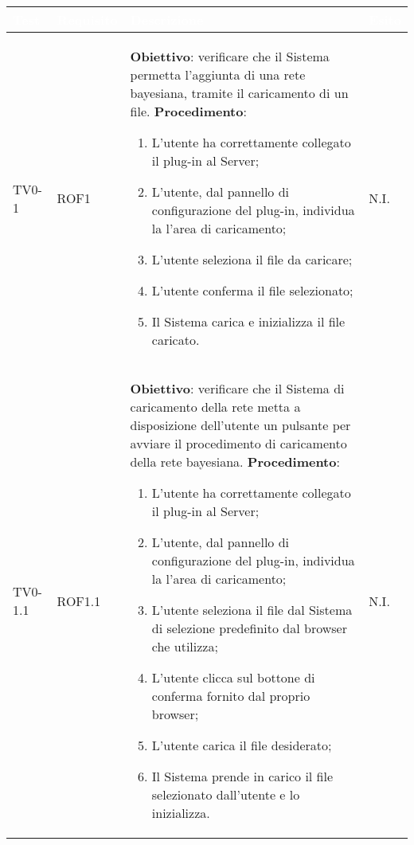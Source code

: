 \begin{longtable}{|C{.15\textwidth}|C{.13\textwidth}|m{.52\textwidth}|C{.08\textwidth}|}
\hline
{}\textbf{\textcolor{white}{Test}} & \textbf{\textcolor{white}{Requisito}} & \textbf{\textcolor{white}{Descrizione}} & \textbf{\textcolor{white}{Esito}}\\
\hline \hline
\endhead

TV0-1 & ROF1 &
	\textbf{Obiettivo}: verificare che il Sistema permetta l'aggiunta di una rete bayesiana, tramite il caricamento di un file. \newline
	\textbf{Procedimento}:
	\begin{enumerate}
		\item L'utente ha correttamente collegato il plug-in al Server;
		\item L'utente, dal pannello di configurazione del plug-in, individua la l'area di caricamento;
		\item L'utente seleziona il file da caricare;
		\item L'utente conferma il file selezionato;
		\item Il Sistema carica e inizializza il file caricato.
	\end{enumerate} & N.I. \\
\hline

 TV0-1.1 & ROF1.1 &
	\textbf{Obiettivo}: verificare che il Sistema di caricamento della rete metta a disposizione dell'utente un pulsante per avviare il procedimento di caricamento della rete bayesiana.
	\textbf{Procedimento}:
	\begin{enumerate}
		\item L'utente ha correttamente collegato il plug-in al Server;
		\item L'utente, dal pannello di configurazione del plug-in, individua la l'area di caricamento;
		\item L'utente seleziona il file dal Sistema di selezione predefinito dal browser che utilizza;
		\item L'utente clicca sul bottone di conferma fornito dal proprio browser;
		\item L'utente carica il file desiderato;
		\item Il Sistema prende in carico il file selezionato dall'utente e lo inizializza.
	\end{enumerate}
	& N.I. \\
\hline


\end{longtable}

